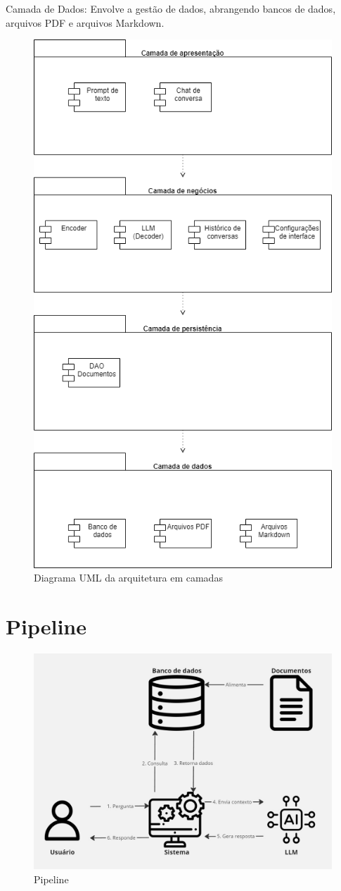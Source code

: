 \documentclass[
	12pt,				%
	openright,			%
	oneside,			    %
	a4paper,				%
	english,			%
	french,			%
	spanish,			%
	brazil			%
	]{abntex2}
\begin{document}
Camada de Dados: Envolve a gestão de dados, abrangendo bancos de dados, arquivos PDF e arquivos Markdown.
\begin{figure}[h]
    \centering
    \includegraphics[width=0.5\linewidth]{ArquiteturaCamadas.drawio.png}
    \caption{Diagrama UML da arquitetura em camadas}
    \label{fig:enter-label}
\end{figure}

\clearpage
\section{Pipeline}

\begin{figure}[h]
    \centering
    \includegraphics[width=0.8\linewidth]{Pipeline.jpg}
    \caption{Pipeline}
    \label{fig:enter-label}
\end{figure}
\end{document}
